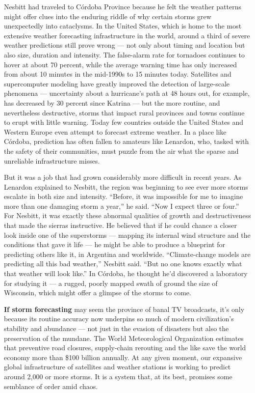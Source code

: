 Nesbitt had traveled to Córdoba Province because he felt the weather
patterns might offer clues into the enduring riddle of why certain
storms grew unexpectedly into cataclysms. In the United States, which is
home to the most extensive weather forecasting infrastructure in the
world, around a third of severe weather predictions still prove wrong
--- not only about timing and location but also size, duration and
intensity. The false-alarm rate for tornadoes continues to hover at
about 70 percent, while the average warning time has only increased from
about 10 minutes in the mid-1990s to 15 minutes today. Satellites and
supercomputer modeling have greatly improved the detection of
large-scale phenomena --- uncertainty about a hurricane's path at 48
hours out, for example, has decreased by 30 percent since Katrina ---
but the more routine, and nevertheless destructive, storms that impact
rural provinces and towns continue to erupt with little warning. Today
few countries outside the United States and Western Europe even attempt
to forecast extreme weather. In a place like Córdoba, prediction has
often fallen to amateurs like Lenardon, who, tasked with the safety of
their communities, must puzzle from the air what the sparse and
unreliable infrastructure misses.

But it was a job that had grown considerably more difficult in recent
years. As Lenardon explained to Nesbitt, the region was beginning to see
ever more storms escalate in both size and intensity. ``Before, it was
impossible for me to imagine more than one damaging storm a year,'' he
said. ``Now I expect three or four.'' For Nesbitt, it was exactly these
abnormal qualities of growth and destructiveness that made the sierras
instructive. He believed that if he could chance a closer look inside
one of the superstorms --- mapping its internal wind structure and the
conditions that gave it life --- he might be able to produce a blueprint
for predicting others like it, in Argentina and worldwide.
``Climate-change models are predicting all this bad weather,'' Nesbitt
said. ``But no one knows exactly what that weather will look like.'' In
Córdoba, he thought he'd discovered a laboratory for studying it --- a
rugged, poorly mapped swath of ground the size of Wisconsin, which might
offer a glimpse of the storms to come.

\textbf{If storm forecasting} may seem the province of banal TV
broadcasts, it's only because its routine accuracy now underpins so much
of modern civilization's stability and abundance --- not just in the
evasion of disasters but also the preservation of the mundane. The World
Meteorological Organization estimates that preventive road closures,
supply-chain rerouting and the like save the world economy more than
\$100 billion annually. At any given moment, our expansive global
infrastructure of satellites and weather stations is working to predict
around 2,000 or more storms. It is a system that, at its best, promises
some semblance of order amid chaos.

